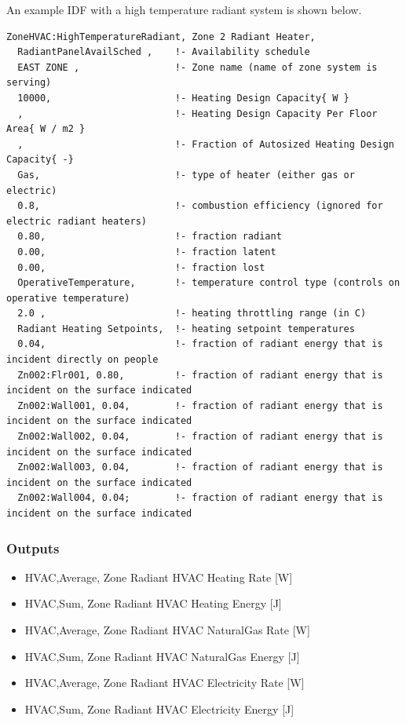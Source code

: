 An example IDF with a high temperature radiant system is shown below.

\begin{lstlisting}
ZoneHVAC:HighTemperatureRadiant, Zone 2 Radiant Heater,
  RadiantPanelAvailSched ,    !- Availability schedule
  EAST ZONE ,                 !- Zone name (name of zone system is serving)
  10000,                      !- Heating Design Capacity{ W }
  ,                           !- Heating Design Capacity Per Floor Area{ W / m2 }
  ,                           !- Fraction of Autosized Heating Design Capacity{ -}
  Gas,                        !- type of heater (either gas or electric)
  0.8,                        !- combustion efficiency (ignored for electric radiant heaters)
  0.80,                       !- fraction radiant
  0.00,                       !- fraction latent
  0.00,                       !- fraction lost
  OperativeTemperature,       !- temperature control type (controls on operative temperature)
  2.0 ,                       !- heating throttling range (in C)
  Radiant Heating Setpoints,  !- heating setpoint temperatures
  0.04,                       !- fraction of radiant energy that is incident directly on people
  Zn002:Flr001, 0.80,         !- fraction of radiant energy that is incident on the surface indicated
  Zn002:Wall001, 0.04,        !- fraction of radiant energy that is incident on the surface indicated
  Zn002:Wall002, 0.04,        !- fraction of radiant energy that is incident on the surface indicated
  Zn002:Wall003, 0.04,        !- fraction of radiant energy that is incident on the surface indicated
  Zn002:Wall004, 0.04;        !- fraction of radiant energy that is incident on the surface indicated
\end{lstlisting}

\subsubsection{Outputs}\label{outputs-8-006}

\begin{itemize}
\item
  HVAC,Average, Zone Radiant HVAC Heating Rate {[}W{]}
\item
  HVAC,Sum, Zone Radiant HVAC Heating Energy {[}J{]}
\item
  HVAC,Average, Zone Radiant HVAC NaturalGas Rate {[}W{]}
\item
  HVAC,Sum, Zone Radiant HVAC NaturalGas Energy {[}J{]}
\item
  HVAC,Average, Zone Radiant HVAC Electricity Rate {[}W{]}
\item
  HVAC,Sum, Zone Radiant HVAC Electricity Energy {[}J{]}
\end{itemize}

